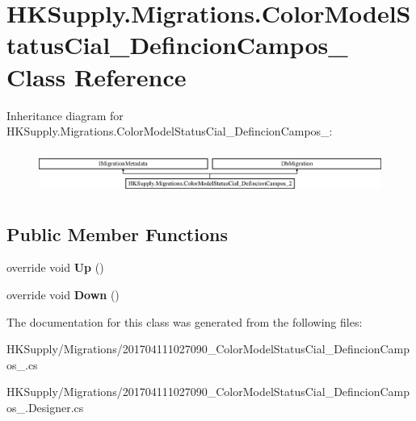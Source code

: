 \hypertarget{class_h_k_supply_1_1_migrations_1_1_color_model_status_cial___defincion_campos__2}{}\section{H\+K\+Supply.\+Migrations.\+Color\+Model\+Status\+Cial\+\_\+\+Defincion\+Campos\+\_ Class Reference}
\label{class_h_k_supply_1_1_migrations_1_1_color_model_status_cial___defincion_campos__2}
Inheritance diagram for H\+K\+Supply.\+Migrations.\+Color\+Model\+Status\+Cial\+\_\+\+Defincion\+Campos\+\_\+:\begin{figure}[H]
\begin{center}
\leavevmode
\includegraphics[height=1.454545cm]{class_h_k_supply_1_1_migrations_1_1_color_model_status_cial___defincion_campos__2}
\end{center}
\end{figure}
\subsection*{Public Member Functions}
\begin{DoxyCompactItemize}
\item 
\mbox{\label{class_h_k_supply_1_1_migrations_1_1_color_model_status_cial___defincion_campos__2_a49808e1f560d17ab8150b05caebcb48d}} 
override void {\bfseries Up} ()
\item 
\mbox{\label{class_h_k_supply_1_1_migrations_1_1_color_model_status_cial___defincion_campos__2_a8f85b18d2027a33e0f0b01085881ecaf}} 
override void {\bfseries Down} ()
\end{DoxyCompactItemize}


The documentation for this class was generated from the following files\+:\begin{DoxyCompactItemize}
\item 
H\+K\+Supply/\+Migrations/201704111027090\+\_\+\+Color\+Model\+Status\+Cial\+\_\+\+Defincion\+Campos\+\_.\+cs\item 
H\+K\+Supply/\+Migrations/201704111027090\+\_\+\+Color\+Model\+Status\+Cial\+\_\+\+Defincion\+Campos\+\_.\+Designer.\+cs\end{DoxyCompactItemize}
